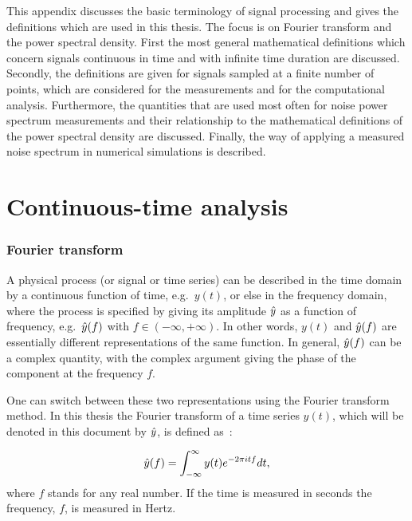 
This appendix discusses the basic terminology of signal processing and gives the definitions which are used in this thesis. The focus is on Fourier transform and the power spectral density. First the most general mathematical definitions which concern signals continuous in time and with infinite time duration are discussed. Secondly, the definitions are given for signals sampled at a finite number of points, which are considered for the measurements and for the computational analysis. Furthermore, the quantities that are used most often for noise power spectrum measurements and their relationship to the mathematical definitions of the power spectral density are discussed. Finally, the way of applying a measured noise spectrum in numerical simulations is described.

\section{Continuous-time analysis}\label{app:continuous_time_analysis}
\subsubsection*{Fourier transform} %
A physical process (or signal or time series) can be described in the time domain by a continuous function of time, e.g.~$y(t)$, or else in the frequency domain, where the process is specified by giving its amplitude $\hat{y}$ as a function of frequency, e.g.~$\hat{y}(f)$ with $f \in \left(-\infty, +\infty \right )$. In other words, $y(t)$ and $\hat{y}(f)$ are essentially different representations of the same function.  In general, $\hat{y}(f)$ can be a complex quantity, with the complex argument giving the phase of the component at the frequency $f$.

One can switch between these two representations using the Fourier transform method. In this thesis the Fourier transform of a time series $y(t)$, which will be denoted in this document by $\hat{y}$, is defined as~\cite{a_numerical_recipies}: %

\begin{equation}\label{eq:fft_definition}
\hat{y}(f) = \int_{-\infty}^{\infty} y(t) e^{-2\pi {i} t f} dt,
\end{equation}
where $f$ stands for any real number. 
If the time is measured in seconds the frequency, $f$, is measured in Hertz. 

